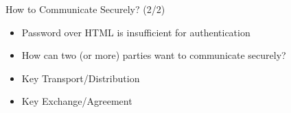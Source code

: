 \documentclass[notes,xcolor=dvipsnames]{beamer}
\begin{document}
\begin{frame}{How to Communicate Securely? (2/2)}

\begin{itemize}
	\item Password over HTML is insufficient for authentication
	\item How can two (or more) parties want to communicate securely?
\end{itemize}
	

  \pause
	\vspace*{2em}
	\begin{itemize}
		\item Key Transport/Distribution
		\item<1-| alert@2> Key Exchange/Agreement
	\end{itemize}
\end{frame}
	
\end{document}
